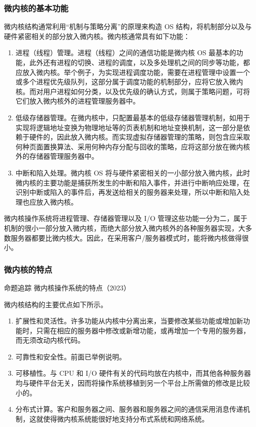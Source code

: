 \documentclass{ctexbook}
\begin{document}
		\subsubsection{微内核的基本功能}
		微内核结构通常利用“机制与策略分离”的原理来构造 OS 结构，将机制部分以及与硬件紧密相关的部分放入微内核。微内核通常具有如下功能：
		\begin{enumerate}
			\item 进程（线程）管理。进程（线程）之间的通信功能是微内核 OS 最基本的功能，此外还有进程的切换、进程的调度，以及多处理机之间的同步等功能，都应放入微内核。举个例子，为实现进程调度功能，需要在进程管理中设置一个或多个进程优先级队列，这部分属于调度功能的机制部分，应将它放入微内核。而对用户进程如何分类，以及优先级的确认方式，则属于策略问题，可将它们放入微内核外的进程管理服务器中。
			\item 低级存储器管理。在微内核中，只配置最基本的低级存储器管理机制，如用于实现将逻辑地址变换为物理地址等的页表机制和地址变换机制，这一部分是依赖于硬件的，因此放入微内核。而实现虚拟存储器管理的策略，则包含应采取何种页面置换算法、采用何种内存分配与回收的策略，应将这部分放在微内核外的存储器管理服务器中。
			\item 中断和陷入处理。微内核 OS 将与硬件紧密相关的一小部分放入微内核，此时微内核的主要功能是捕获所发生的中断和陷入事件，并进行中断响应处理，在识别中断或陷入的事件后，再发送给相关的服务器来处理，所以中断和陷入处理也应放入微内核。
		\end{enumerate}
		
		微内核操作系统将进程管理、存储器管理以及 I/O 管理这些功能一分为二，属于机制的很小一部分放入微内核，而绝大部分放入微内核外的各种服务器实现，大多数服务器都要比微内核大。因此，在采用客户/服务器模式时，能将微内核做得很小。
		
		\subsubsection{微内核的特点}
		\colorbox{gray!20}{命题追踪 \enspace 微内核操作系统的特点（2023）}
		
		微内核结构的主要优点如下所示。
		\begin{enumerate}
			\item 扩展性和灵活性。许多功能从内核中分离出来，当要修改某些功能或增加新功能时，只需在相应的服务器中修改或新增功能，或再增加一个专用的服务器，而无须改动内核代码。
			\item 可靠性和安全性。前面已举例说明。
			\item 可移植性。与 CPU 和 I/O 硬件有关的代码均放在内核中，而其他各种服务器均与硬件平台无关，因而将操作系统移植到另一个平台上所需做的修改是比较小的。
			\item 分布式计算。客户和服务器之间、服务器和服务器之间的通信采用消息传递机制，这就使得微内核系统能很好地支持分布式系统和网络系统。
		\end{enumerate}
		
\end{document}
